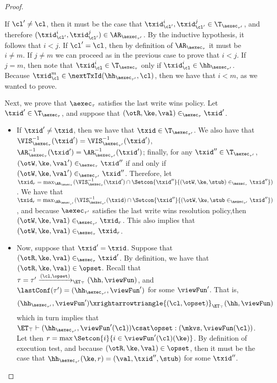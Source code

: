 \begin{proof}
\begin{itemize}
\begin{itemize}
If $\cl' \neq \cl$, then it must be the case that $\txid_{\cl'}^{i}, \txid_{\cl'}^{j} \in \T_{\aexec_{\tau'}}$, 
and therefore $(\txid_{\cl'}^{i}, \txid_{\cl'}^{j}) \in \AR_{\aexec_{\tau'}}$. By the inductive hypothesis, 
it follows that $i < j$. If $\cl' = \cl$, then by definition of $\AR_{\aexec_{\tau}}$ it must be  $i \neq m$. 
If $j \neq m$ we can proceed as in the previous case to prove that $i < j$. If $j = m$, then 
note that $\txid_{\cl}^{i} \in \T_{\aexec_{\tau}}$ only if $\txid_{\cl}^{i} \in \hh_{\aexec_{\tau'}}$. 
Because $\txid_{\cl}^{m} \in \nextTxId(\hh_{\aexec_{\tau'}}, \cl)$, then we have that $i < m$, 
as we wanted to prove.
\end{itemize}

Next, we prove that $\aexec_{\tau}$ satisfies the last write wins policy. 
Let $\txid' \in \T_{\aexec_{\tau}}$, and suppose that $(\otR, \ke, \val) \in_{\aexec_{\tau}} \txid'$. 
\begin{itemize} 
\item If $\txid' \neq \txid$, then we have that $\txid \in \T_{\aexec_{\tau'}}$. We also have that 
$\VIS^{-1}_{\aexec_{\tau}}(\txid') = \VIS^{-1}_{\aexec_{\tau'}}(\txid')$, $\AR^{-1}_{\aexec_{\tau}}(\txid') 
= \AR^{-1}_{\aexec_{\tau'}}(\txid')$; finally, for any $\txid'' \in \T_{\aexec_{\tau'}}$, 
$(\otW, \ke, \val') \in_{\aexec_{\tau}} \txid''$ if and only if $(\otW, \ke, \val') \in_{\aexec_{\tau'}} 
\txid''$. Therefore, let $\txid_{r} = \max_{\AR_{\aexec_{\tau}}}(\VIS^{-1}_{\aexec_{\tau}}(\txid') \cap 
\Setcon{\txid'' }{ (\otW, \ke, \stub) \in_{\aexec_{\tau}} \txid''})$. We have that $\txid_{r} = \max_{\AR_{\aexec_{\tau'}}}(\VIS^{-1}_{\aexec_{\tau'}}(\txid) 
\cap \Setcon{ \txid'' }{ (\otW, \ke, \stub \in_{\aexec_{\tau'}} \txid''})$, and because $\aexec_{\tau'}$ satisfies the last write 
wins resolution policy,then $(\otW, \ke, \val) \in_{\aexec_{\tau'}} \txid_{r}$. This also implies that 
$(\otW, \ke, \val) \in_{\aexec_{\tau}} \txid_{r}$. 

\item Now, suppose that $\txid' = \txid$. Suppose that $(\otR, \ke, \val) \in_{\aexec_{\tau}} \txid'$. 
By definition, we have that $(\otR, \ke, \val) \in \opset$. Recall that $\tau = \tau' \xrightarrow{(\cl, \opset)}_{\ET_{\top}} (\hh, \viewFun)$, 
and $\lastConf(\tau') = (\hh_{\aexec_{\tau'}}, \viewFun')$ for some $\viewFun'$. 
That is, 
\[
    (\hh_{\aexec_{\tau'}}, \viewFun') \xrightarrowtriangle{(\cl, \opset)}_{\ET_{\top}} (\hh, \viewFun)
\]
which in turn implies that $\ET_{\top} \vdash (\hh_{\aexec_{\tau'}}, \viewFun'(\cl)) \csat \opset : (\mkvs,\viewFun(\cl) )$. 
Let then $r = \max\Setcon{i}{  i \in \viewFun'(\cl)(\ke)}$. 
By definition of execution test, and because $(\otR, \ke, \val) \in \opset$, then it must be the case that 
$\hh_{\aexec_{\tau'}}(\ke, r) = (\val, \txid'', \stub)$ for some $\txid''$. 


\end{itemize}
\end{itemize}
\end{proof}
